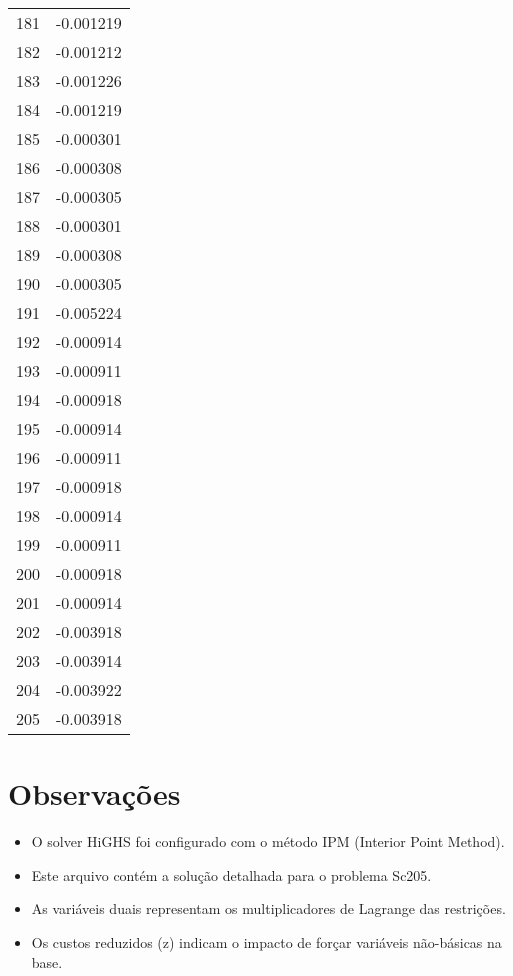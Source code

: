 \documentclass[12pt]{article}
\begin{document}
\begin{longtable}{@{}cc@{}}
181 & -0.001219 \\
182 & -0.001212 \\
183 & -0.001226 \\
184 & -0.001219 \\
185 & -0.000301 \\
186 & -0.000308 \\
187 & -0.000305 \\
188 & -0.000301 \\
189 & -0.000308 \\
190 & -0.000305 \\
191 & -0.005224 \\
192 & -0.000914 \\
193 & -0.000911 \\
194 & -0.000918 \\
195 & -0.000914 \\
196 & -0.000911 \\
197 & -0.000918 \\
198 & -0.000914 \\
199 & -0.000911 \\
200 & -0.000918 \\
201 & -0.000914 \\
202 & -0.003918 \\
203 & -0.003914 \\
204 & -0.003922 \\
205 & -0.003918 \\

\end{longtable}


\section{Observações}

\begin{itemize}
\item O solver HiGHS foi configurado com o método IPM (Interior Point Method).
\item Este arquivo contém a solução detalhada para o problema Sc205.
\item As variáveis duais representam os multiplicadores de Lagrange das restrições.
\item Os custos reduzidos (z) indicam o impacto de forçar variáveis não-básicas na base.
\end{itemize}
\end{document}
